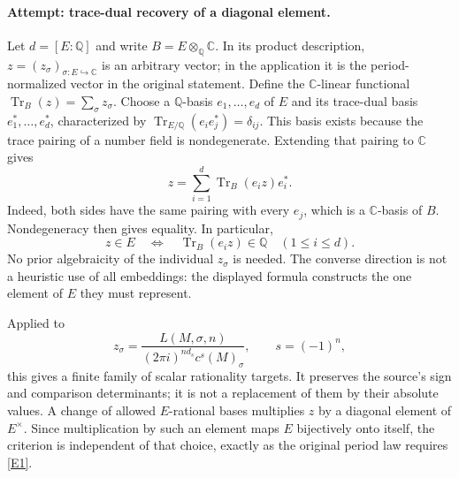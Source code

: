 \documentclass[11pt,a4paper]{article}
\numberwithin{equation}{section}
\newcommand{\Q}{\mathbb{Q}}
\newcommand{\C}{\mathbb{C}}
\newcommand{\eref}[2]{\hyperlink{extra:#1:#2}{[E#2]}}
\begin{document}
\paragraph{Attempt: trace-dual recovery of a diagonal element.}
Let $d=[E:\Q]$ and write $B=E\otimes_{\Q}\C$. In its product description,
$z=(z_\sigma)_{\sigma:E\hookrightarrow\C}$ is an arbitrary vector; in the
application it is the period-normalized vector in the original statement.
Define the $\C$-linear functional
$\operatorname{Tr}_B(z)=\sum_\sigma z_\sigma$.
Choose a $\Q$-basis $e_1,\ldots,e_d$ of $E$ and its trace-dual basis
$e_1^*,\ldots,e_d^*$, characterized by
$\operatorname{Tr}_{E/\Q}(e_i e_j^*)=\delta_{ij}$.
This basis exists because the trace pairing of a number field is
nondegenerate. Extending that pairing to $\C$ gives
\begin{equation}\label{eq71:reconstruct}
 z=\sum_{i=1}^d\operatorname{Tr}_B(e_i z)e_i^*.
\end{equation}
Indeed, both sides have the same pairing with every $e_j$, which is a
$\C$-basis of $B$. Nondegeneracy then gives equality. In particular,
\begin{equation}\label{eq71:criterion}
 z\in E\quad\Longleftrightarrow\quad
 \operatorname{Tr}_B(e_i z)\in\Q\quad(1\leq i\leq d).
\end{equation}
No prior algebraicity of the individual $z_\sigma$ is needed. The converse
direction is not a heuristic use of all embeddings: the displayed formula
constructs the one element of $E$ they must represent.

Applied to
\[
 z_\sigma=\frac{L(M,\sigma,n)}
 {(2\pi i)^{n d_s}c^s(M)_\sigma},\qquad s=(-1)^n,
\]
this gives a finite family of scalar rationality targets. It preserves the
source's sign and comparison determinants; it is not a replacement of them
by their absolute values. A change of allowed $E$-rational bases multiplies
$z$ by a diagonal element of $E^\times$. Since multiplication by such an
element maps $E$ bijectively onto itself, the criterion is independent of
that choice, exactly as the original period law requires \eref{71}{1}.
\end{document}

